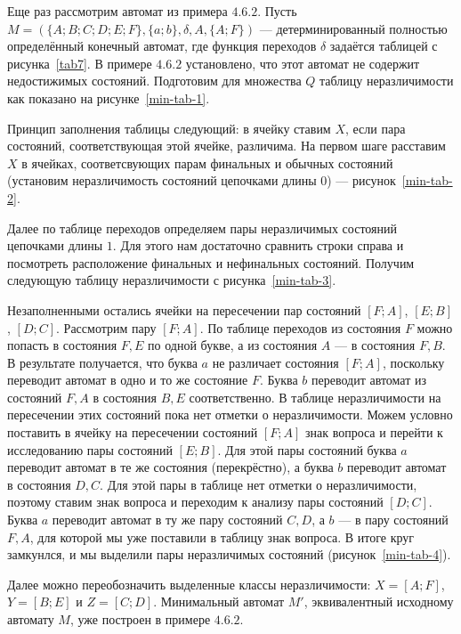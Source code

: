 \begin{myexample} Еще раз рассмотрим автомат из примера $4.6.2$. Пусть 
$M=(\{A;B;C;D;E;F\},\{a;b\},\delta,A,\{A;F\})$ --- детерминированный 
полностью определённый конечный автомат, где функция переходов $\delta$ 
задаётся таблицей с рисунка~\ref{tab7}. В примере $4.6.2$ установлено, 
что этот автомат не содержит недостижимых состояний. Подготовим для 
множества $Q$ таблицу неразличимости как показано на рисунке~\ref{min-tab-1}.

Принцип заполнения таблицы следующий: в ячейку ставим $X$, если пара состояний, соответствующая этой ячейке, различима. На первом шаге расставим $X$ в ячейках, соответсвующих парам финальных и обычных состояний (установим неразличимость состояний цепочками длины $0$) — рисунок~\ref{min-tab-2}.

Далее по таблице переходов определяем пары неразличимых состояний цепочками длины $1$. Для этого нам достаточно сравнить строки справа и посмотреть расположение финальных и нефинальных состояний. Получим следующую таблицу неразличимости с рисунка~\ref{min-tab-3}.

Незаполненными остались ячейки на пересечении пар состояний $[F;A]$, $[E;B]$, $[D;C]$. Рассмотрим пару $[F;A]$. По таблице переходов из состояния $F$ можно попасть в состояния $F, E$ по одной букве, а из состояния $A$ --- в состояния $F, B$. В результате получается, что буква $a$ не различает состояния $[F;A]$, поскольку переводит автомат в одно и то же состояние $F$. Буква $b$ переводит автомат из состояний $F, A$ в состояния $B, E$ соответственно. В таблице неразличимости на пересечении этих состояний пока нет отметки о неразличимости. Можем условно поставить в ячейку на пересечении состояний $[F;A]$ знак вопроса и перейти к исследованию пары состояний $[E;B]$. Для этой пары состояний буква $a$ переводит автомат в те же состояния (перекрёстно), а буква $b$ переводит автомат в состояния $D, C$. Для этой пары в таблице нет отметки о неразличимости, поэтому ставим знак вопроса и переходим к анализу пары состояний  $[D;C]$. Буква $a$ переводит автомат в ту же пару состояний $C, D$, а $b$ --- в пару состояний $F, A$, для которой мы уже поставили в таблицу знак вопроса. В итоге круг замкунлся, и мы выделили пары неразличимых состояний (рисунок~\ref{min-tab-4}).

Далее можно переобозначить выделенные классы неразличимости: $X = [A;F]$, $Y = [B;E]$ и $Z = [C;D]$. Минимальный автомат $M'$, эквивалентный исходному автомату $M$, уже построен в примере $4.6.2$.
\end{myexample}


